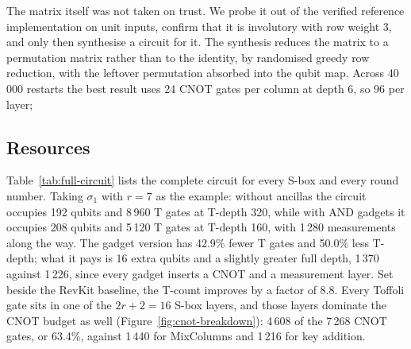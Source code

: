 \documentclass[runningheads,10pt]{llncs}
\begin{document}
The matrix itself was not taken on trust. We probe it out of the verified reference implementation on unit inputs, confirm that it is involutory with row weight 3, and only then synthesise a circuit for it. The synthesis reduces the matrix to a permutation matrix rather than to the identity, by randomised greedy row reduction, with the leftover permutation absorbed into the qubit map. Across 40\,000 restarts the best result uses 24 CNOT gates per column at depth 6, so 96 per layer;

\subsection{Resources}

Table~\ref{tab:full-circuit} lists the complete circuit for every S-box and every round number. Taking $\sigma_1$ with $r=7$ as the example: without ancillas the circuit occupies 192 qubits and 8\,960 T gates at T-depth 320, while with AND gadgets it occupies 208 qubits and 5\,120 T gates at T-depth 160, with 1\,280 measurements along the way. The gadget version has 42.9\% fewer T gates and 50.0\% less T-depth; what it pays is 16 extra qubits and a slightly greater full depth, 1\,370 against 1\,226, since every gadget inserts a CNOT and a measurement layer. Set beside the RevKit baseline, the T-count improves by a factor of 8.8. Every Toffoli gate sits in one of the $2r+2=16$ S-box layers, and those layers dominate the CNOT budget as well (Figure~\ref{fig:cnot-breakdown}): 4\,608 of the 7\,268 CNOT gates, or 63.4\%, against 1\,440 for MixColumns and 1\,216 for key addition.
\end{document}
